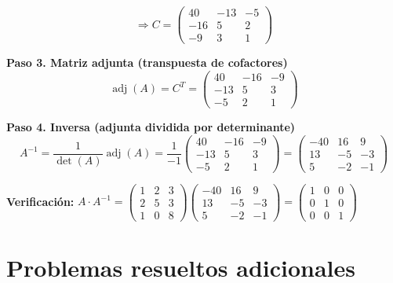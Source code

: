 \begin{example}
\begin{myproof}
\[
\Rightarrow C = \begin{pmatrix} 40 & -13 & -5 \\ -16 & 5 & 2 \\ -9 & 3 & 1 \end{pmatrix}
\]

\textbf{Paso 3. Matriz adjunta (transpuesta de cofactores)}
\[
\operatorname{adj}(A) = C^T = \begin{pmatrix} 40 & -16 & -9 \\ -13 & 5 & 3 \\ -5 & 2 & 1 \end{pmatrix}
\]

\textbf{Paso 4. Inversa (adjunta dividida por determinante)}
\[
A^{-1} = \frac{1}{\det(A)} \operatorname{adj}(A) = \frac{1}{-1} \begin{pmatrix} 40 & -16 & -9 \\ -13 & 5 & 3 \\ -5 & 2 & 1 \end{pmatrix} = \boxed{\begin{pmatrix} -40 & 16 & 9 \\ 13 & -5 & -3 \\ 5 & -2 & -1 \end{pmatrix}}
\]

\textbf{Verificación:} \( A \cdot A^{-1} = \begin{pmatrix} 1 & 2 & 3 \\ 2 & 5 & 3 \\ 1 & 0 & 8 \end{pmatrix} \begin{pmatrix} -40 & 16 & 9 \\ 13 & -5 & -3 \\ 5 & -2 & -1 \end{pmatrix} = \begin{pmatrix} 1 & 0 & 0 \\ 0 & 1 & 0 \\ 0 & 0 & 1 \end{pmatrix}
\)
\end{myproof}
\end{example}

\section{Problemas resueltos adicionales}

